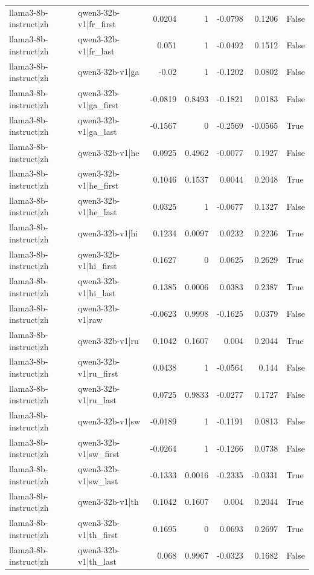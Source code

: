 \begin{table}
\begin{tabular}{l l r r r r l}
llama3-8b-instruct|zh & qwen3-32b-v1|fr_first & 0.0204 & 1 & -0.0798 & 0.1206 & False \\
llama3-8b-instruct|zh & qwen3-32b-v1|fr_last & 0.051 & 1 & -0.0492 & 0.1512 & False \\
llama3-8b-instruct|zh & qwen3-32b-v1|ga & -0.02 & 1 & -0.1202 & 0.0802 & False \\
llama3-8b-instruct|zh & qwen3-32b-v1|ga_first & -0.0819 & 0.8493 & -0.1821 & 0.0183 & False \\
llama3-8b-instruct|zh & qwen3-32b-v1|ga_last & -0.1567 & 0 & -0.2569 & -0.0565 & True \\
llama3-8b-instruct|zh & qwen3-32b-v1|he & 0.0925 & 0.4962 & -0.0077 & 0.1927 & False \\
llama3-8b-instruct|zh & qwen3-32b-v1|he_first & 0.1046 & 0.1537 & 0.0044 & 0.2048 & True \\
llama3-8b-instruct|zh & qwen3-32b-v1|he_last & 0.0325 & 1 & -0.0677 & 0.1327 & False \\
llama3-8b-instruct|zh & qwen3-32b-v1|hi & 0.1234 & 0.0097 & 0.0232 & 0.2236 & True \\
llama3-8b-instruct|zh & qwen3-32b-v1|hi_first & 0.1627 & 0 & 0.0625 & 0.2629 & True \\
llama3-8b-instruct|zh & qwen3-32b-v1|hi_last & 0.1385 & 0.0006 & 0.0383 & 0.2387 & True \\
llama3-8b-instruct|zh & qwen3-32b-v1|raw & -0.0623 & 0.9998 & -0.1625 & 0.0379 & False \\
llama3-8b-instruct|zh & qwen3-32b-v1|ru & 0.1042 & 0.1607 & 0.004 & 0.2044 & True \\
llama3-8b-instruct|zh & qwen3-32b-v1|ru_first & 0.0438 & 1 & -0.0564 & 0.144 & False \\
llama3-8b-instruct|zh & qwen3-32b-v1|ru_last & 0.0725 & 0.9833 & -0.0277 & 0.1727 & False \\
llama3-8b-instruct|zh & qwen3-32b-v1|sw & -0.0189 & 1 & -0.1191 & 0.0813 & False \\
llama3-8b-instruct|zh & qwen3-32b-v1|sw_first & -0.0264 & 1 & -0.1266 & 0.0738 & False \\
llama3-8b-instruct|zh & qwen3-32b-v1|sw_last & -0.1333 & 0.0016 & -0.2335 & -0.0331 & True \\
llama3-8b-instruct|zh & qwen3-32b-v1|th & 0.1042 & 0.1607 & 0.004 & 0.2044 & True \\
llama3-8b-instruct|zh & qwen3-32b-v1|th_first & 0.1695 & 0 & 0.0693 & 0.2697 & True \\
llama3-8b-instruct|zh & qwen3-32b-v1|th_last & 0.068 & 0.9967 & -0.0323 & 0.1682 & False \\

\end{tabular}
\end{table}
